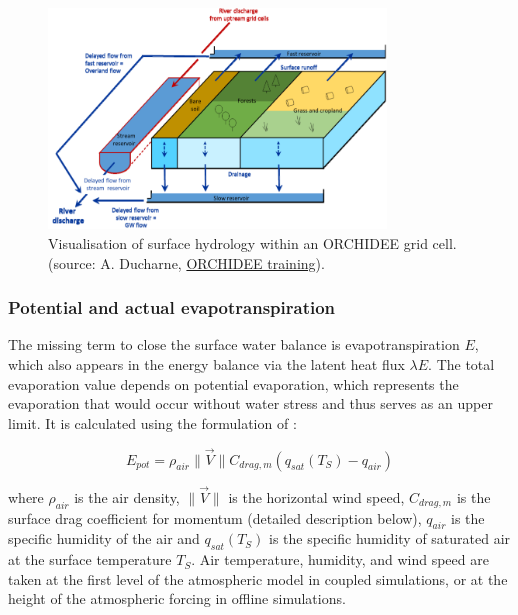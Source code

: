\begin{figure}[hbtp]
    \centering
    \includegraphics[width=0.8\textwidth]{images/methods/water_balance_AD.png}
    \caption{Visualisation of surface hydrology within an ORCHIDEE grid cell. (source: A. Ducharne, \href{https://forge.ipsl.fr/orchidee/attachment/wiki/GroupActivities/Training/cours_orchidee_feb2024_ducharne.pdf}{ORCHIDEE training}).}
    \label{fig:water_balance_AD}
\end{figure}


\subsubsection*{Potential and actual evapotranspiration}

The missing term to close the surface water balance is evapotranspiration $E$, which also appears in the energy balance via the latent heat flux $\lambda E$. The total evaporation value depends on potential evaporation, which represents the evaporation that would occur without water stress and thus serves as an upper limit. It is calculated using the formulation of \citet{Budyko_1956}:  

\begin{equation}
    E_{pot} = \rho_{air}  \lVert \vec{V} \rVert C_{drag, m} (q_{sat}(T_S) - q_{air})
\end{equation}

where $\rho_{air}$ is the air density, $\lVert \vec{V} \rVert$ is the horizontal wind speed, $C_{drag, m}$ is the surface drag coefficient for momentum (detailed description below), $q_{air}$ is the specific humidity of the air and $q_{sat}(T_S)$ is the specific humidity of saturated air at the surface temperature $T_S$. Air temperature, humidity, and wind speed are taken at the first level of the atmospheric model in coupled simulations, or at the height of the atmospheric forcing in offline simulations.

